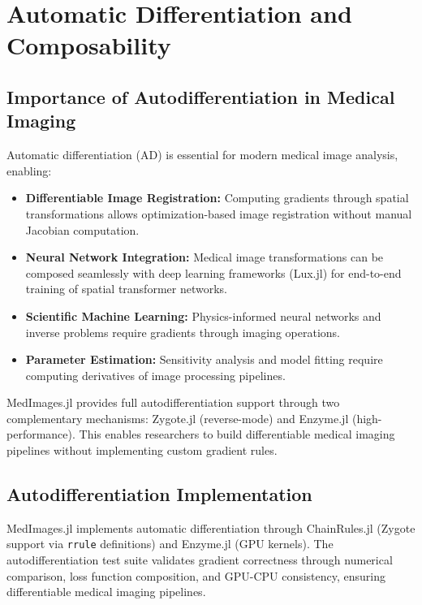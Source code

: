 \documentclass[a4paper,10pt]{elsarticle}
\begin{document}
  \section{Automatic Differentiation and Composability}
  \label{sec:autodiff}

  \subsection{Importance of Autodifferentiation in Medical Imaging}

  Automatic differentiation (AD) is essential for modern medical image analysis, enabling:

  \begin{itemize}
      \item \textbf{Differentiable Image Registration:} Computing gradients through spatial transformations allows optimization-based image registration without manual Jacobian computation.

      \item \textbf{Neural Network Integration:} Medical image transformations can be composed seamlessly with deep learning frameworks (Lux.jl) for end-to-end training of spatial transformer networks.

      \item \textbf{Scientific Machine Learning:} Physics-informed neural networks and inverse problems require gradients through imaging operations.

      \item \textbf{Parameter Estimation:} Sensitivity analysis and model fitting require computing derivatives of image processing pipelines.
  \end{itemize}

  MedImages.jl provides full autodifferentiation support through two complementary mechanisms: Zygote.jl (reverse-mode) and Enzyme.jl (high-performance). This enables researchers to build differentiable medical imaging pipelines without
  implementing custom gradient rules.

  \subsection{Autodifferentiation Implementation}

  MedImages.jl implements automatic differentiation through ChainRules.jl (Zygote support via \texttt{rrule} definitions) and Enzyme.jl (GPU kernels). The autodifferentiation test suite validates gradient correctness through numerical
  comparison, loss function composition, and GPU-CPU consistency, ensuring differentiable medical imaging pipelines.
\end{document}
